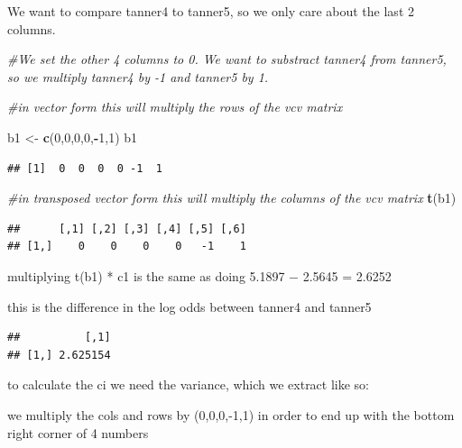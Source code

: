 \documentclass[
]{article}
\newenvironment{Shaded}{\begin{snugshade}}{\end{snugshade}}
\newcommand{\CommentTok}[1]{\textcolor[rgb]{0.56,0.35,0.01}{\textit{#1}}}
\newcommand{\DecValTok}[1]{\textcolor[rgb]{0.00,0.00,0.81}{#1}}
\newcommand{\KeywordTok}[1]{\textcolor[rgb]{0.13,0.29,0.53}{\textbf{#1}}}
\newcommand{\NormalTok}[1]{#1}
\newcommand{\OperatorTok}[1]{\textcolor[rgb]{0.81,0.36,0.00}{\textbf{#1}}}
\newcommand{\StringTok}[1]{\textcolor[rgb]{0.31,0.60,0.02}{#1}}
\begin{document}
We want to compare tanner4 to tanner5, so we only care about the last 2
columns.

\begin{Shaded}
\begin{Highlighting}[]
\CommentTok{#We set the other 4 columns to 0. We want to substract tanner4 from tanner5, so we multiply tanner4 by -1 and tanner5 by 1.}

\CommentTok{#in vector form this will multiply the rows of the vcv matrix }

\NormalTok{b1 <-}\StringTok{ }\KeywordTok{c}\NormalTok{(}\DecValTok{0}\NormalTok{,}\DecValTok{0}\NormalTok{,}\DecValTok{0}\NormalTok{,}\DecValTok{0}\NormalTok{,}\OperatorTok{-}\DecValTok{1}\NormalTok{,}\DecValTok{1}\NormalTok{)}
\NormalTok{b1}
\end{Highlighting}
\end{Shaded}

\begin{verbatim}
## [1]  0  0  0  0 -1  1
\end{verbatim}

\begin{Shaded}
\begin{Highlighting}[]
\CommentTok{#in transposed vector form this will multiply the columns of the vcv matrix }
\KeywordTok{t}\NormalTok{(b1) }
\end{Highlighting}
\end{Shaded}

\begin{verbatim}
##      [,1] [,2] [,3] [,4] [,5] [,6]
## [1,]    0    0    0    0   -1    1
\end{verbatim}

multiplying t(b1) * c1 is the same as doing 5.1897 − 2.5645 = 2.6252

this is the difference in the log odds between tanner4 and tanner5

\begin{Shaded}
\end{Shaded}

\begin{verbatim}
##          [,1]
## [1,] 2.625154
\end{verbatim}

to calculate the ci we need the variance, which we extract like so:

we multiply the cols and rows by (0,0,0,-1,1) in order to end up with
the bottom right corner of 4 numbers
\end{document}
